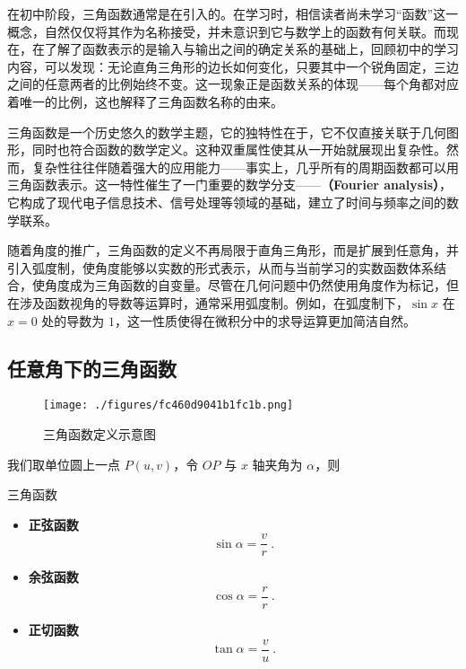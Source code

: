 \begin{issues}
\issueDraft
\end{issues}

在初中阶段，三角函数通常是在引入的。在学习时，相信读者尚未学习“函数”这一概念，自然仅仅将其作为名称接受，并未意识到它与数学上的函数有何关联。而现在，在了解了函数表示的是输入与输出之间的确定关系的基础上，回顾初中的学习内容，可以发现：无论直角三角形的边长如何变化，只要其中一个锐角固定，三边之间的任意两者的比例始终不变。这一现象正是函数关系的体现——每个角都对应着唯一的比例，这也解释了三角函数名称的由来。

三角函数是一个历史悠久的数学主题，它的独特性在于，它不仅直接关联于几何图形，同时也符合函数的数学定义。这种双重属性使其从一开始就展现出复杂性。然而，复杂性往往伴随着强大的应用能力——事实上，几乎所有的周期函数都可以用三角函数表示。这一特性催生了一门重要的数学分支——\textbf{（Fourier analysis）}，它构成了现代电子信息技术、信号处理等领域的基础，建立了时间与频率之间的数学联系。

随着角度的推广，三角函数的定义不再局限于直角三角形，而是扩展到任意角，并引入弧度制，使角度能够以实数的形式表示，从而与当前学习的实数函数体系结合，使角度成为三角函数的自变量。尽管在几何问题中仍然使用角度作为标记，但在涉及函数视角的导数等运算时，通常采用弧度制。例如，在弧度制下，$\sin x$ 在 $x=0$ 处的导数为 $1$，这一性质使得在微积分中的求导运算更加简洁自然。

\subsection{任意角下的三角函数}

\begin{figure}[ht]
\centering
\texttt{[image: ./figures/fc460d9041b1fc1b.png]}
\caption{三角函数定义示意图} \label{fig_HsTrFu_5}
\end{figure}

我们取单位圆上一点 $P(u,v)$，令 $OP$ 与 $x$ 轴夹角为 $\alpha$，则

\begin{definition}{三角函数}
\begin{itemize}
\item \textbf{正弦函数}
\begin{equation}
\displaystyle\sin \alpha = \frac{v}{r}~.
\end{equation}
\item \textbf{余弦函数}
\begin{equation}
\displaystyle\cos \alpha = \frac{r}{r}~.
\end{equation}
\item \textbf{正切函数}
\begin{equation}
\displaystyle\tan \alpha = \frac{v}{u}~.
\end{equation}
\end{itemize}
\end{definition}

